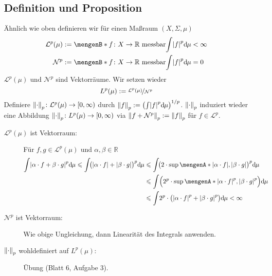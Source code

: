 \subsection[Definition und Proposition: Der Raum $L^p(\mu)$]{Definition und Proposition} %
\label{sub:43}
Ähnlich wie oben definieren wir für einen Maßraum $(X,\Sigma,\mu)$
\begin{align*}
	\mathcal{L}^p(\mu) &:= \set[f \colon X \to \mathds{R} \text{ messbar}]{\int \abs*{f}^p \mathd \mu < \infty } \\
	\mathcal{N}^p &:= \set[f \colon X \to \mathds{R} \text{ messbar}]{\int \abs*{f}^p \mathd \mu = 0 } 
\end{align*}
$\mathcal{L}^p(\mu)$ und $\mathcal{N}^p$ sind Vektorräume. Wir setzen wieder
\[
	L^p(\mu) := \nicefrac{\mathcal{L}^p(\mu)}{\mathcal{N}^p}
\]
Definiere $\norm[p]{\cdot } \colon \mathcal{L}^p(\mu) \to [0,\infty)$ durch $\norm[p]{f} := \enbrace*{\int \abs*{f}^p \mathd \mu }^{1/p}$. $\norm[p]{\cdot}$ induziert wieder 
eine Abbildung $\norm[p]{\cdot } \colon L^p(\mu) \to [0,\infty) $ via $\norm[p]{f + \mathcal{N}^p} := \norm[p]{f} $ für $f \in \mathcal{L}^p$.
\begin{description}
	\item[$\mathcal{L}^p(\mu)$ ist Vektorraum:]  Für $f,g \in \mathcal{L}^p(\mu)$ und $\alpha, \beta \in \mathds{R}$
	\begin{align*}
		\int \abs*{\alpha \cdot f + \beta \cdot g}^p \mathd \mu \le \int \!\enbrace[\big]{\abs*{\alpha \cdot f} + \abs*{\beta \cdot g}}^p \mathd \mu
		&\le \int \!\enbrace[\big]{2 \cdot \sup \set{\abs*{\alpha \cdot f}, \abs*{\beta \cdot g}  } }^p \mathd \mu \\ 
		&\le \int \enbrace*{2^p \cdot \sup \set{\abs*{\alpha \cdot f}^p, \abs*{\beta \cdot g}^p  \rule{0cm}{1em}} } \mathd \mu \\ 
		&\le \int \!2^p \cdot  \enbrace[\big]{\abs*{\alpha \cdot f}^p + \abs*{\beta \cdot g}^p} \mathd \mu < \infty 
	\end{align*}
	\item[$\mathcal{N}^p$ ist Vektorraum:] Wie obige Ungleichung, dann Linearität des Integrals anwenden.
	\item[{$\norm[p]{\cdot}$ wohldefiniert auf $L^p(\mu)$:}] Übung (Blatt 6, Aufgabe 3). \bewende
\end{description}

